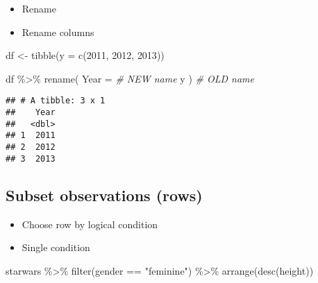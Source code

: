 \documentclass[
]{book}
\newenvironment{Shaded}{\begin{snugshade}}{\end{snugshade}}
\newcommand{\AttributeTok}[1]{\textcolor[rgb]{0.77,0.63,0.00}{#1}}
\newcommand{\CommentTok}[1]{\textcolor[rgb]{0.56,0.35,0.01}{\textit{#1}}}
\newcommand{\DecValTok}[1]{\textcolor[rgb]{0.00,0.00,0.81}{#1}}
\newcommand{\FunctionTok}[1]{\textcolor[rgb]{0.00,0.00,0.00}{#1}}
\newcommand{\NormalTok}[1]{#1}
\newcommand{\OtherTok}[1]{\textcolor[rgb]{0.56,0.35,0.01}{#1}}
\newcommand{\SpecialCharTok}[1]{\textcolor[rgb]{0.00,0.00,0.00}{#1}}
\newcommand{\StringTok}[1]{\textcolor[rgb]{0.31,0.60,0.02}{#1}}
\begin{document}
\begin{itemize}
\item
  Rename
\item
  Rename columns
\end{itemize}

\begin{Shaded}
\begin{Highlighting}[]
\NormalTok{df }\OtherTok{\textless{}{-}} \FunctionTok{tibble}\NormalTok{(}\AttributeTok{y =} \FunctionTok{c}\NormalTok{(}\DecValTok{2011}\NormalTok{, }\DecValTok{2012}\NormalTok{, }\DecValTok{2013}\NormalTok{))}

\NormalTok{df }\SpecialCharTok{\%\textgreater{}\%}
  \FunctionTok{rename}\NormalTok{(}
    \AttributeTok{Year =} \CommentTok{\# NEW name}
\NormalTok{    y}
\NormalTok{  ) }\CommentTok{\# OLD name}
\end{Highlighting}
\end{Shaded}

\begin{verbatim}
## # A tibble: 3 x 1
##    Year
##   <dbl>
## 1  2011
## 2  2012
## 3  2013
\end{verbatim}

\hypertarget{subset-observations-rows}{%
\subsection{Subset observations (rows)}\label{subset-observations-rows}}

\begin{itemize}
\item
  Choose row by logical condition
\item
  Single condition
\end{itemize}

\begin{Shaded}
\begin{Highlighting}[]
\NormalTok{starwars }\SpecialCharTok{\%\textgreater{}\%}
  \FunctionTok{filter}\NormalTok{(gender }\SpecialCharTok{==} \StringTok{"feminine"}\NormalTok{) }\SpecialCharTok{\%\textgreater{}\%}
  \FunctionTok{arrange}\NormalTok{(}\FunctionTok{desc}\NormalTok{(height))}
\end{Highlighting}
\end{Shaded}
\end{document}

